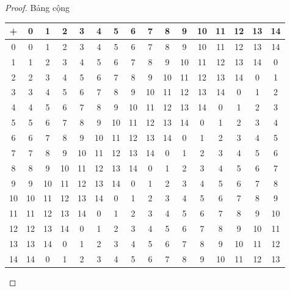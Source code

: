 \begin{proof}
    \par Bảng cộng
    \\
    \begin{tabular}{c|ccccccccccccccc}
        +  & 0  & 1  & 2  & 3  & 4  & 5  & 6  & 7  & 8  & 9  & 10 & 11 & 12 & 13 & 14 \\
        \hline
        0  & 0  & 1  & 2  & 3  & 4  & 5  & 6  & 7  & 8  & 9  & 10 & 11 & 12 & 13 & 14 \\
        1  & 1  & 2  & 3  & 4  & 5  & 6  & 7  & 8  & 9  & 10 & 11 & 12 & 13 & 14 & 0  \\
        2  & 2  & 3  & 4  & 5  & 6  & 7  & 8  & 9  & 10 & 11 & 12 & 13 & 14 & 0  & 1  \\
        3  & 3  & 4  & 5  & 6  & 7  & 8  & 9  & 10 & 11 & 12 & 13 & 14 & 0  & 1  & 2  \\
        4  & 4  & 5  & 6  & 7  & 8  & 9  & 10 & 11 & 12 & 13 & 14 & 0  & 1  & 2  & 3  \\
        5  & 5  & 6  & 7  & 8  & 9  & 10 & 11 & 12 & 13 & 14 & 0  & 1  & 2  & 3  & 4  \\
        6  & 6  & 7  & 8  & 9  & 10 & 11 & 12 & 13 & 14 & 0  & 1  & 2  & 3  & 4  & 5  \\
        7  & 7  & 8  & 9  & 10 & 11 & 12 & 13 & 14 & 0  & 1  & 2  & 3  & 4  & 5  & 6  \\
        8  & 8  & 9  & 10 & 11 & 12 & 13 & 14 & 0  & 1  & 2  & 3  & 4  & 5  & 6  & 7  \\
        9  & 9  & 10 & 11 & 12 & 13 & 14 & 0  & 1  & 2  & 3  & 4  & 5  & 6  & 7  & 8  \\
        10 & 10 & 11 & 12 & 13 & 14 & 0  & 1  & 2  & 3  & 4  & 5  & 6  & 7  & 8  & 9  \\
        11 & 11 & 12 & 13 & 14 & 0  & 1  & 2  & 3  & 4  & 5  & 6  & 7  & 8  & 9  & 10 \\
        12 & 12 & 13 & 14 & 0  & 1  & 2  & 3  & 4  & 5  & 6  & 7  & 8  & 9  & 10 & 11 \\
        13 & 13 & 14 & 0  & 1  & 2  & 3  & 4  & 5  & 6  & 7  & 8  & 9  & 10 & 11 & 12 \\
        14 & 14 & 0  & 1  & 2  & 3  & 4  & 5  & 6  & 7  & 8  & 9  & 10 & 11 & 12 & 13
    \end{tabular}
    \bigskip


\end{proof}
